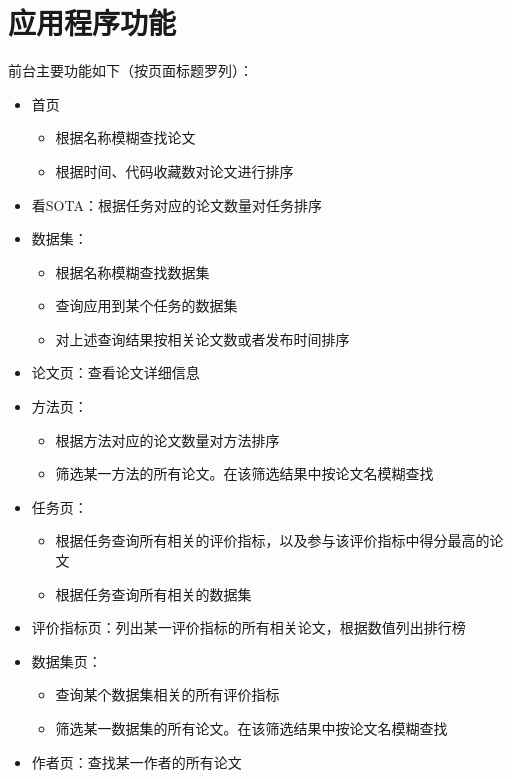 \section{应用程序功能}
前台主要功能如下（按页面标题罗列）：

\begin{itemize}
    \item 首页
    \begin{itemize}
        \item 根据名称模糊查找论文
        \item 根据时间、代码收藏数对论文进行排序
    \end{itemize}
    \item 看SOTA：根据任务对应的论文数量对任务排序
    \item 数据集：
    \begin{itemize}
        \item 根据名称模糊查找数据集
        \item 查询应用到某个任务的数据集
        \item 对上述查询结果按相关论文数或者发布时间排序
    \end{itemize}
    \item 论文页：查看论文详细信息
    \item 方法页：
    \begin{itemize}
        \item 根据方法对应的论文数量对方法排序
        \item 筛选某一方法的所有论文。在该筛选结果中按论文名模糊查找
    \end{itemize}
    \item 任务页：
    \begin{itemize}
        \item 根据任务查询所有相关的评价指标，以及参与该评价指标中得分最高的论文
        \item 根据任务查询所有相关的数据集
    \end{itemize}
    \item 评价指标页：列出某一评价指标的所有相关论文，根据数值列出排行榜
    \item 数据集页：
    \begin{itemize}
        \item 查询某个数据集相关的所有评价指标
        \item 筛选某一数据集的所有论文。在该筛选结果中按论文名模糊查找
    \end{itemize}
    \item 作者页：查找某一作者的所有论文
\end{itemize}
